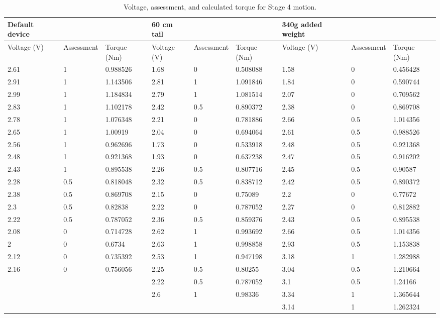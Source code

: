 \begin{landscape}
\begin{table}[!ht]
	\centering
	\caption{Voltage, assessment, and calculated torque for Stage 4 motion.}
	\footnotesize
	\begin{tabular}{|l|l|l|l|l|l|l|l|l|}
		\hline
		Default device & ~ & ~ & 60 cm tail & ~ & ~ & 340g added weight & ~ & ~ \\ \hline
		Voltage (V) & Assessment & Torque (Nm) & Voltage (V) & Assessment & Torque (Nm) & Voltage (V) & Assessment & Torque (Nm) \\ \hline
		2.61 & 1 & 0.988526 & 1.68 & 0 & 0.508088 & 1.58 & 0 & 0.456428 \\ \hline
		2.91 & 1 & 1.143506 & 2.81 & 1 & 1.091846 & 1.84 & 0 & 0.590744 \\ \hline
		2.99 & 1 & 1.184834 & 2.79 & 1 & 1.081514 & 2.07 & 0 & 0.709562 \\ \hline
		2.83 & 1 & 1.102178 & 2.42 & 0.5 & 0.890372 & 2.38 & 0 & 0.869708 \\ \hline
		2.78 & 1 & 1.076348 & 2.21 & 0 & 0.781886 & 2.66 & 0.5 & 1.014356 \\ \hline
		2.65 & 1 & 1.00919 & 2.04 & 0 & 0.694064 & 2.61 & 0.5 & 0.988526 \\ \hline
		2.56 & 1 & 0.962696 & 1.73 & 0 & 0.533918 & 2.48 & 0.5 & 0.921368 \\ \hline
		2.48 & 1 & 0.921368 & 1.93 & 0 & 0.637238 & 2.47 & 0.5 & 0.916202 \\ \hline
		2.43 & 1 & 0.895538 & 2.26 & 0.5 & 0.807716 & 2.45 & 0.5 & 0.90587 \\ \hline
		2.28 & 0.5 & 0.818048 & 2.32 & 0.5 & 0.838712 & 2.42 & 0.5 & 0.890372 \\ \hline
		2.38 & 0.5 & 0.869708 & 2.15 & 0 & 0.75089 & 2.2 & 0 & 0.77672 \\ \hline
		2.3 & 0.5 & 0.82838 & 2.22 & 0 & 0.787052 & 2.27 & 0 & 0.812882 \\ \hline
		2.22 & 0.5 & 0.787052 & 2.36 & 0.5 & 0.859376 & 2.43 & 0.5 & 0.895538 \\ \hline
		2.08 & 0 & 0.714728 & 2.62 & 1 & 0.993692 & 2.66 & 0.5 & 1.014356 \\ \hline
		2 & 0 & 0.6734 & 2.63 & 1 & 0.998858 & 2.93 & 0.5 & 1.153838 \\ \hline
		2.12 & 0 & 0.735392 & 2.53 & 1 & 0.947198 & 3.18 & 1 & 1.282988 \\ \hline
		2.16 & 0 & 0.756056 & 2.25 & 0.5 & 0.80255 & 3.04 & 0.5 & 1.210664 \\ \hline
		~ & ~ & ~ & 2.22 & 0.5 & 0.787052 & 3.1 & 0.5 & 1.24166 \\ \hline
		~ & ~ & ~ & 2.6 & 1 & 0.98336 & 3.34 & 1 & 1.365644 \\ \hline
		~ & ~ & ~ & ~ & ~ & ~ & 3.14 & 1 & 1.262324 \\ \hline
	\end{tabular}
\end{table}


\end{landscape}
